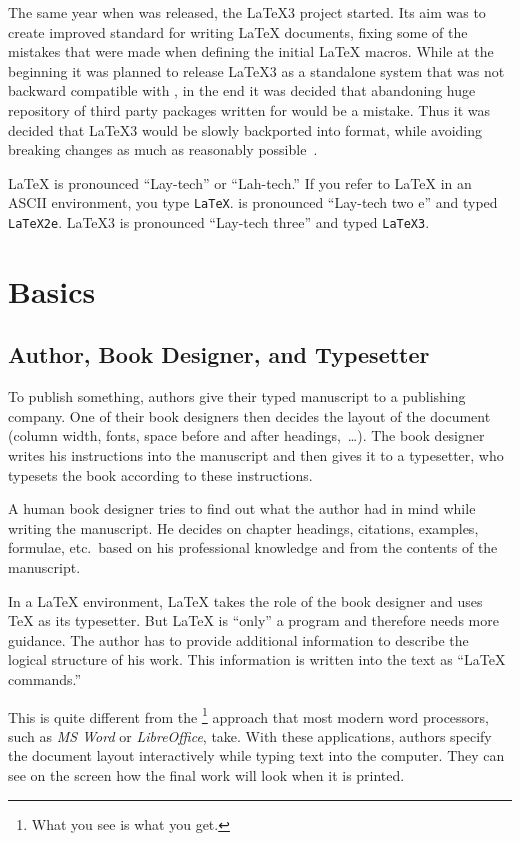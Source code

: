 The same year when \LaTeXe{} was released, the \LaTeX3 project started. Its aim
was to create improved standard for writing \LaTeX{} documents, fixing some of
the mistakes that were made when defining the initial \LaTeX{} macros. While at
the beginning it was planned to release \LaTeX3 as a standalone system that
was not backward compatible with \LaTeXe{}, in the end it was decided that
abandoning huge repository of third party packages written for \LaTeXe{} would
be a mistake. Thus it was decided that \LaTeX3 would be slowly backported into
\LaTeXe{} format, while avoiding breaking changes as much as reasonably
possible~\cite{quovadis}.

\LaTeX{} is pronounced ``Lay-tech'' or ``Lah-tech.'' If you refer to
\LaTeX{} in an ASCII environment, you type \texttt{LaTeX}.
\LaTeXe{} is pronounced ``Lay-tech two e'' and typed \texttt{LaTeX2e}.
\LaTeX3 is pronounced ``Lay-tech three'' and typed \texttt{LaTeX3}.

\section{Basics}

\subsection{Author, Book Designer, and Typesetter}

To publish something, authors give their typed manuscript to a
publishing company. One of their book designers then
decides the layout of the document (column width, fonts, space before
and after headings,~\ldots). The book designer writes his instructions
into the manuscript and then gives it to a typesetter, who typesets the
book according to these instructions.

A human book designer tries to find out what the author had in mind
while writing the manuscript. He decides on chapter headings,
citations, examples, formulae, etc.\ based on his professional
knowledge and from the contents of the manuscript.

In a \LaTeX{} environment, \LaTeX{} takes the role of the book
designer and uses \TeX{} as its typesetter. But \LaTeX{} is ``only'' a
program and therefore needs more guidance. The author has to provide
additional information to describe the logical structure of his
work. This information is written into the text as ``\LaTeX{}
commands.''

This is quite different from the \footnote{What you see is
  what you get.} approach that most modern word processors, such as
\emph{MS Word} or \emph{LibreOffice}, take. With these
applications, authors specify the document layout interactively while
typing text into the computer. They can see on the
screen how the final work will look when it is printed.

